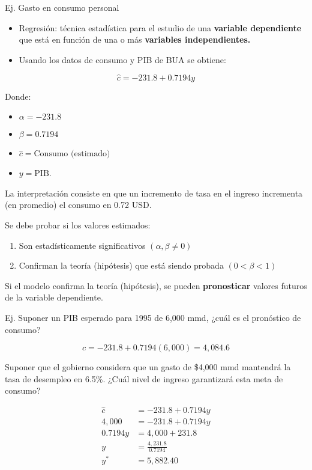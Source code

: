 \documentclass[
]{book}
\providecommand{\tightlist}{%
  \setlength{\itemsep}{0pt}\setlength{\parskip}{0pt}}
\begin{document}
Ej. Gasto en consumo personal

\begin{itemize}
\tightlist
\item
  Regresión: técnica estadística para el estudio de una \textbf{variable dependiente} que está en función de una o más \textbf{variables independientes.}
\item
  Usando los datos de consumo y PIB de BUA se obtiene:
\end{itemize}

\[ 
\hat c = -231.8 + 0.7194 y
\]

Donde:

\begin{itemize}
\tightlist
\item
  \(\alpha = -231.8\)
\item
  \(\beta = 0.7194\)
\item
  \(\hat c = \text{Consumo (estimado)}\)
\item
  \(y = \text{PIB}\).
\end{itemize}

La interpretación consiste en que un incremento de tasa en el ingreso incrementa (en promedio) el consumo en 0.72 USD.

Se debe probar si los valores estimados:

\begin{enumerate}
\def\labelenumi{\arabic{enumi}.}
\tightlist
\item
  Son estadísticamente significativos \((\alpha, \beta \neq 0)\)\\
\item
  Confirman la teoría (hipótesis) que está siendo probada \((0<\beta<1)\)
\end{enumerate}

Si el modelo confirma la teoría (hipótesis), se pueden \textbf{pronosticar} valores futuros de la variable dependiente.

Ej. Suponer un PIB esperado para 1995 de 6,000 mmd, ¿cuál es el pronóstico de consumo?

\[
\hat c = -231.8 + 0.7194(6,000) = 4,084.6 
\]

Suponer que el gobierno considera que un gasto de \$4,000 mmd mantendrá la tasa de desempleo en 6.5\%. ¿Cuál nivel de ingreso garantizará esta meta de consumo?

\[
\begin{aligned} 
\hat c &= -231.8 + 0.7194y \\
4,000 &= -231.8 + 0.7194y \\ 
0.7194y &= 4,000 + 231.8 \\ 
y &= \frac{4,231.8}{0.7194} \\ 
y^* &= 5,882.40 
\end{aligned}
\]
\end{document}
